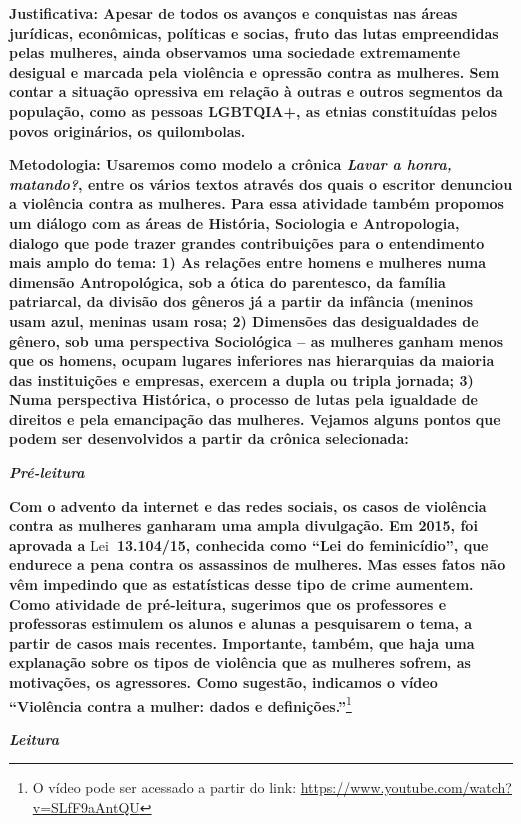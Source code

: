 \textbf{Justificativa: Apesar de todos os avanços e conquistas nas áreas
jurídicas, econômicas, políticas e socias, fruto das lutas empreendidas
pelas mulheres, ainda observamos uma sociedade extremamente desigual e
marcada pela violência e opressão contra as mulheres. Sem contar a
situação opressiva em relação à outras e outros segmentos da população,
como as pessoas LGBTQIA+, as etnias constituídas pelos povos
originários, os quilombolas. }

\textbf{Metodologia: Usaremos como modelo a crônica \emph{Lavar a honra,
matando?}, entre os vários textos através dos quais o escritor denunciou
a violência contra as mulheres. Para essa atividade também propomos um
diálogo com as áreas de História, Sociologia e Antropologia, dialogo que
pode trazer grandes contribuições para o entendimento mais amplo do
tema: 1) As relações entre homens e mulheres numa dimensão
Antropológica, sob a ótica do parentesco, da família patriarcal, da
divisão dos gêneros já a partir da infância (meninos usam azul, meninas
usam rosa; 2) Dimensões das desigualdades de gênero, sob uma perspectiva
Sociológica -- as mulheres ganham menos que os homens, ocupam lugares
inferiores nas hierarquias da maioria das instituições e empresas,
exercem a dupla ou tripla jornada; 3) Numa perspectiva Histórica, o
processo de lutas pela igualdade de direitos e pela emancipação das
mulheres. Vejamos alguns pontos que podem ser desenvolvidos a partir da
crônica selecionada:}

\emph{\textbf{Pré-leitura}}

\textbf{Com o advento da internet e das redes sociais, os casos de
violência contra as mulheres ganharam uma ampla divulgação. Em 2015, foi
aprovada a} Lei\textbf{~13.104/15, conhecida como ``Lei do
feminicídio'', que endurece a pena contra os assassinos de mulheres. Mas
esses fatos não vêm impedindo que as estatísticas desse tipo de crime
aumentem. Como atividade de pré-leitura, sugerimos que os professores e
professoras estimulem os alunos e alunas a pesquisarem o tema, a partir
de casos mais recentes. Importante, também, que haja uma explanação
sobre os tipos de violência que as mulheres sofrem, as motivações, os
agressores. Como sugestão, indicamos o vídeo ``Violência contra a
mulher: dados e definições.''}\footnote{O vídeo pode ser acessado a
  partir do link: \url{https://www.youtube.com/watch?v=SLfF9aAntQU}}

\emph{\textbf{Leitura}}

